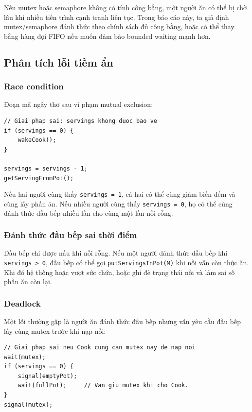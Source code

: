 Nếu mutex hoặc semaphore không có tính công bằng, một người ăn có thể bị chờ
lâu khi nhiều tiến trình cạnh tranh liên tục. Trong báo cáo này, ta giả định
mutex/semaphore đánh thức theo chính sách đủ công bằng, hoặc có thể thay bằng
hàng đợi FIFO nếu muốn đảm bảo bounded waiting mạnh hơn.

\subsection{Phân tích lỗi tiềm ẩn}

\subsubsection*{Race condition}

Đoạn mã ngây thơ sau vi phạm mutual exclusion:

\begin{lstlisting}
// Giai phap sai: servings khong duoc bao ve
if (servings == 0) {
    wakeCook();
}

servings = servings - 1;
getServingFromPot();
\end{lstlisting}

Nếu hai người cùng thấy \texttt{servings = 1}, cả hai có thể cùng giảm biến
đếm và cùng lấy phần ăn. Nếu nhiều người cùng thấy \texttt{servings = 0}, họ có
thể cùng đánh thức đầu bếp nhiều lần cho cùng một lần nồi rỗng.

\subsubsection*{Đánh thức đầu bếp sai thời điểm}

Đầu bếp chỉ được nấu khi nồi rỗng. Nếu một người đánh thức đầu bếp khi
\texttt{servings > 0}, đầu bếp có thể gọi \texttt{putServingsInPot(M)} khi nồi
vẫn còn thức ăn. Khi đó hệ thống hoặc vượt sức chứa, hoặc ghi đè trạng thái nồi
và làm sai số phần ăn còn lại.

\subsubsection*{Deadlock}

Một lỗi thường gặp là người ăn đánh thức đầu bếp nhưng vẫn yêu cầu đầu bếp lấy
cùng mutex trước khi nạp nồi:

\begin{lstlisting}
// Giai phap sai neu Cook cung can mutex nay de nap noi
wait(mutex);
if (servings == 0) {
    signal(emptyPot);
    wait(fullPot);     // Van giu mutex khi cho Cook.
}
signal(mutex);
\end{lstlisting}


